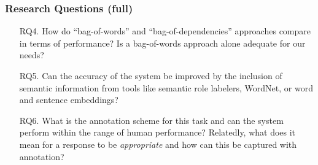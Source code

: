 \documentclass[xcolor={dvipsnames}]{beamer}
\begin{document}
\begin{frame}
\frametitle{Research Questions (full)}
\small
\begin{itemize}
\pause
\item[RQ4.]{How do ``bag-of-words'' and ``bag-of-dependencies'' approaches compare in terms of performance? Is a bag-of-words approach alone adequate for our needs?}
\pause
\vspace{2em}
\item[RQ5.]{Can the accuracy of the system be improved by the inclusion of semantic information from tools like semantic role labelers, WordNet, or word and sentence embeddings?}

\pause
\vspace{2em}
\item[RQ6.]{What is the annotation scheme for this task and can the system perform within the range of human performance? Relatedly, what does it mean for a response to be \textit{appropriate} and how can this be captured with annotation?}
\end{itemize}
\end{frame}
\end{document}
